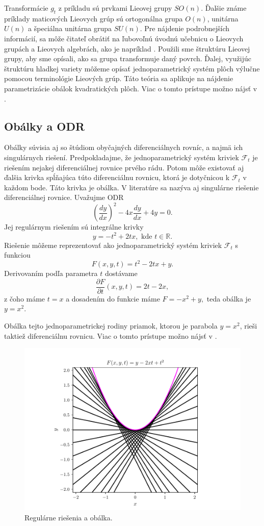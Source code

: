 Transformácie $g_{t}$ z príkladu sú prvkami Lieovej grupy $SO(n)$. Ďalšie známe príklady maticových Lieovych grúp sú ortogonálna grupa $O(n)$, unitárna $U(n)$ a špeciálna unitárna grupa $SU(n).$ 
Pre nájdenie podrobnejších informácií, sa môže čitateľ obrátiť na ľubovoľnú úvodnú učebnicu o Lieovych grupách a Lieovych algebrách, ako je napríklad \cite{Lee12}.
Použili sme štruktúru Lieovej grupy, aby sme opísali, ako sa grupa transformuje daný povrch. Ďalej, využijúc štruktúru hladkej variety môžeme opísať jednoparametrický systém plôch výlučne pomocou terminológie Lieových grúp. Táto teória sa aplikuje na nájdenie parametrizácie obálok kvadratických plôch. Viac o tomto prístupe možno nájsť v \cite{Vra22}. 

\subsection{Obálky a ODR}
Obálky súvisia aj so štúdiom obyčajných diferenciálnych rovníc, a najmä ich singulárnych riešení. Predpokladajme, že jednoparametrický systém kriviek $\mathcal{F}_t$ je riešením nejakej diferenciálnej rovnice prvého rádu. Potom môže existovať aj ďalšia krivka spĺňajúca túto diferenciálnu rovnicu, ktorá je dotyčnicou k $\mathcal{F}_t$ v každom bode. Táto krivka je obálka. V literatúre sa nazýva aj singulárne riešenie diferenciálnej rovnice.
Uvažujme ODR 
$$
\left(\frac{dy}{dx}\right)^2 - 4x\frac{dy}{dx} + 4y = 0.
$$
Jej regulárnym riešením sú integrálne krivky 
$$ y = - t^2 + 2tx, \text{ kde } t \in \mathbb{R}.$$
Riešenie môžeme reprezentovať ako jednoparametrický systém kriviek $\mathcal{F}_t$ s funkciou
$$F(x,y,t) = t^2 - 2tx + y. $$
Derivovaním podľa parametra $t$ dostávame
$$\dfrac{\partial F}{\partial t} (x,y,t) = 2t - 2x, $$
z čoho máme $t=x$ a dosadením do funkcie máme $F=-x^2+y,$ teda obálka je $y=x^2.$

Obálka tejto jednoparametrickej rodiny priamok, ktorou je parabola $y = x^2$, rieši taktiež diferenciálnu rovnicu. Viac o tomto prístupe možno nájsť v \cite{Gro97}.

\begin{figure}[H]
	\centering
	\includegraphics{images/odr.pdf}
	\caption{Regulárne riešenia a obálka.}
	\label{fig:odr}
\end{figure}

